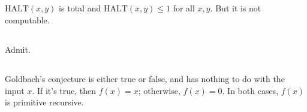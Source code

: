 \subsection{}
$ \mathrm{HALT}(x,y) $ is total and $ \mathrm{HALT}(x,y) \le 1 $ for all $ x,y $.
But it is not computable.


\subsection{}
Admit.


\subsection{}
Goldbach's conjecture is either true or false, and has nothing to do with
the input $x$. If it's true, then $ f(x) = x $; otherwise, $ f(x) = 0 $.
In both cases, $f(x)$ is primitive recursive.

